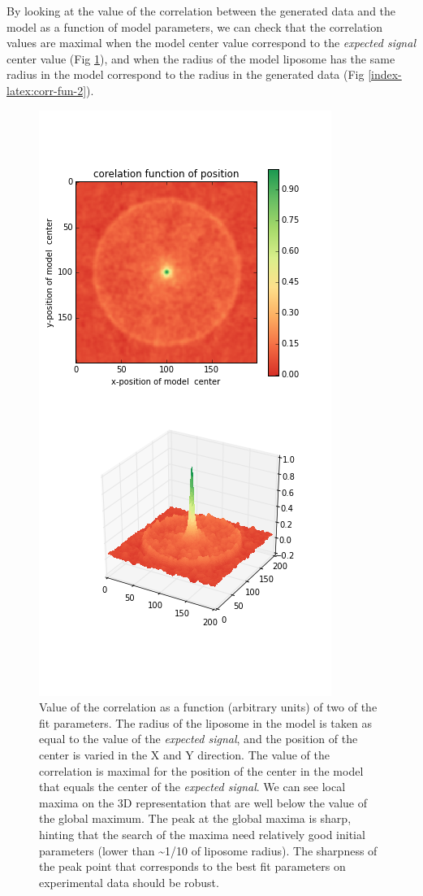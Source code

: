 \documentclass[A4paperpaper,11pt,english]{sphinxmanual}
\begin{document}
By looking at the value of the correlation between the generated data and the model
as a function of model parameters, we can check that the correlation
values are maximal when the model center value correspond to the \emph{expected signal}
center value (Fig \ref{index-latex:corr-fun-1}), and when the radius of the model liposome
has the same radius in the model correspond to the radius in the generated data (Fig \ref{index-latex:corr-fun-2}).
\begin{figure}[htbp]
\centering
\capstart

\includegraphics[width=0.500\linewidth]{double-c-_100-by-100-rc-40_0-noise-0_5-delta-4_0_.png}
\caption{Value of the correlation as a function (arbitrary units) of two of the fit
parameters. The radius of the liposome in the model is taken as
equal to the value of the \emph{expected signal}, and the position of the center is
varied in the X and Y direction. The value of the correlation is maximal for
the position of the center in the model that equals the center of the \emph{expected signal}.  We
can see local maxima on the 3D representation that are well below the value
of the global maximum. The peak at the global maxima is sharp, hinting that
the search of the maxima need relatively good initial
parameters (lower than \textasciitilde{}1/10 of liposome radius). The sharpness of the peak
point that corresponds to the best fit parameters on experimental data should be
robust.}\label{index-latex:corr-fun-1}\end{figure}
\end{document}
